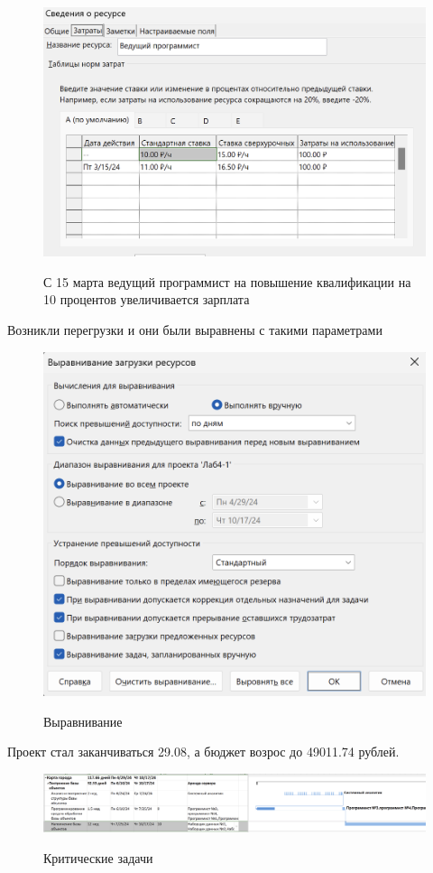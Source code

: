 \begin{figure}[ht!]
	\includegraphics[width=0.75\linewidth]{assets/images/Screenshot 2024-03-09 at 11.35.29.png}
	\label{fig:r2}
	\caption{С 15 марта ведущий программист на повышение квалификации на 10 процентов увеличивается зарплата}
\end{figure}
\FloatBarrier


Возникли перегрузки и они были выравнены с такими параметрами

\begin{figure}[ht!]
	\includegraphics[width=0.75\linewidth]{assets/images/Screenshot 2024-03-09 at 11.37.19.png}
	\label{fig:r2}
	\caption{Выравнивание}
\end{figure}
\FloatBarrier

Проект стал заканчиваться 29.08, а бюджет возрос до 49011.74 рублей.

\begin{figure}[ht!]
	\includegraphics[width=0.75\linewidth]{assets/images/Screenshot 2024-03-09 at 11.39.55.png}
	\label{fig:r2}
	\caption{Критические задачи}
\end{figure}
\FloatBarrier

